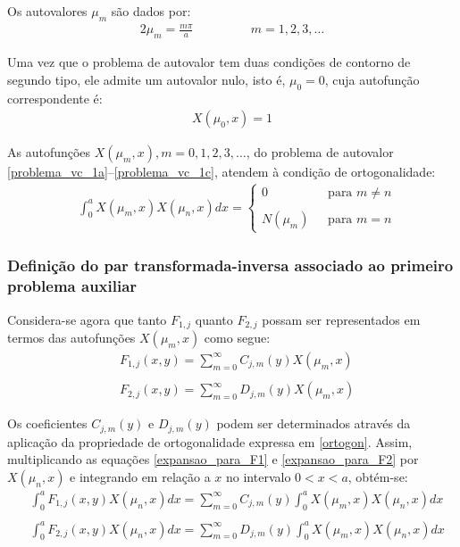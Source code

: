 Os autovalores $\mu_m$ são dados por:
\begin{alignat}{2}
\mu_m = \frac{m\pi}{a} \quad\quad\quad && m = 1,2,3,\ldots
\end{alignat}

Uma vez que o problema de autovalor tem duas condições de contorno de segundo tipo, ele admite um autovalor nulo, isto é, $\mu_0 = 0$, cuja autofunção correspondente é:
\begin{align}
X(\mu_0, x) = 1
\end{align}

As autofunções $X(\mu_m, x), m=0,1,2,3,\ldots$, do problema de autovalor \eqref{problema_vc_1a}--\eqref{problema_vc_1c}, atendem à condição de ortogonalidade:
\begin{align}
& \int_0^a X(\mu_m, x)X(\mu_n, x)dx 
= \left\lbrace
\begin{array}{ll}
0 \quad\quad\quad\quad & \text{para  } m \neq n \\ \\
N(\mu_m) & \text{para  }m = n
\end{array}
\right. \label{ortogon}
\end{align}

\subsubsection{Definição do par transformada-inversa associado ao primeiro problema auxiliar}

Considera-se agora que tanto $F_{1, j}$ quanto $F_{2, j}$ possam ser representados em termos das autofunções $X(\mu_m, x)$ como segue:
\begin{align}
& F_{1, j}(x, y) = \sum_{m=0}^\infty C_{j,m}(y)X(\mu_m, x) \label{expansao_para_F1}\\ \nonumber \\
& F_{2, j}(x, y) = \sum_{m=0}^\infty D_{j,m}(y)X(\mu_m, x) \label{expansao_para_F2}
\end{align}

Os coeficientes $C_{j,m}(y)$ e $D_{j,m}(y)$ podem ser determinados através da aplicação da propriedade de ortogonalidade expressa em \eqref{ortogon}. Assim, multiplicando as equações
\eqref{expansao_para_F1} e \eqref{expansao_para_F2} por $X(\mu_n, x)$ e integrando em relação a $x$ no intervalo $0 < x < a$, obtém-se:
\begin{align}
& \int_0^a F_{1, j}(x, y)X(\mu_n, x)dx = \sum_{m=0}^\infty C_{j,m}(y) \int_0^a X(\mu_m, x)X(\mu_n, x)dx \label{somatorio_para_F1}\\ \nonumber \\
& \int_0^a F_{2, j}(x, y)X(\mu_n, x)dx = \sum_{m=0}^\infty D_{j,m}(y) \int_0^a X(\mu_m, x)X(\mu_n, x)dx \label{somatorio_para_F2}
\end{align}

